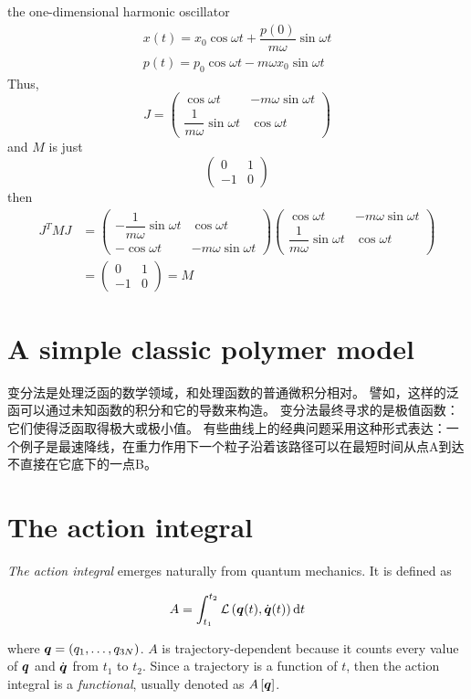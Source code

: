 \example the one-dimensional harmonic oscillator
\begin{gather*}
	x(t)=x_0\cos\omega t+\dfrac{p(0)}{m\omega}\sin\omega t\\
	p(t)=p_0\cos\omega t-m\omega x_0\sin\omega t
\end{gather*}
Thus, 
\begin{equation*}
	J=\begin{pmatrix}
		\cos\omega t & -m\omega\sin\omega t \\
		\dfrac{1}{m\omega}\sin\omega t & \cos\omega t
	\end{pmatrix}
\end{equation*}
and $M$ is just
\begin{equation*}
	\begin{pmatrix}
		0 & 1 \\
		-1 & 0
	\end{pmatrix}
\end{equation*}
then
\begin{align*}
	J^TMJ&=
	\begin{pmatrix}
		-\dfrac{1}{m\omega}\sin\omega t & \cos\omega t \\
		-\cos\omega t & -m\omega\sin\omega t
	\end{pmatrix}
	\begin{pmatrix}
		\cos\omega t & -m\omega\sin\omega t \\
		\dfrac{1}{m\omega}\sin\omega t & \cos\omega t
	\end{pmatrix}\\
	&=\begin{pmatrix}
		0 & 1 \\
		-1 & 0
	\end{pmatrix} = M
\end{align*}

\section{A simple classic polymer model}
变分法是处理泛函的数学领域，和处理函数的普通微积分相对。 譬如，这样的泛函可以通过未知函数的积分和它的导数来构造。 变分法最终寻求的是极值函数：它们使得泛函取得极大或极小值。 有些曲线上的经典问题采用这种形式表达：一个例子是最速降线，在重力作用下一个粒子沿着该路径可以在最短时间从点A到达不直接在它底下的一点B。

\section{The action integral}
\textit{The action integral} emerges naturally from quantum mechanics. It is defined as
\begin{tcolorbox}
	\begin{equation}
		A=\int_{t_1}^{t_2}\mathcal{L}\left(\boldsymbol{q}(t),\dot{\boldsymbol{q}}(t)\right)\mathrm{d}t
	\end{equation}
\end{tcolorbox}
where $\boldsymbol{q}=(q_1,\dots,q_{3N})$. $A$ is trajectory-dependent because it counts every value of $\boldsymbol{q}$ and $\dot{\boldsymbol{q}}$ from $t_1$ to $t_2$. Since a trajectory is a function of $t$, then the action integral is a \textit{functional}, usually denoted as $A\left[\boldsymbol{q}\right]$.

